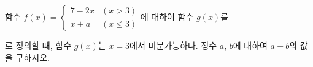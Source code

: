 함수 $f(x)=\begin{cases} 7-2x & (x>3) \\ x+a & (x\le 3) \end{cases}$에 대하여 함수 $g(x)$를\par\smallskip{}\par\smallskip\noindent 로 정의할 때, 함수 $g(x)$는 $x=3$에서 미분가능하다. 정수 $a$, $b$에 대하여 $a+b$의 값을 구하시오.
